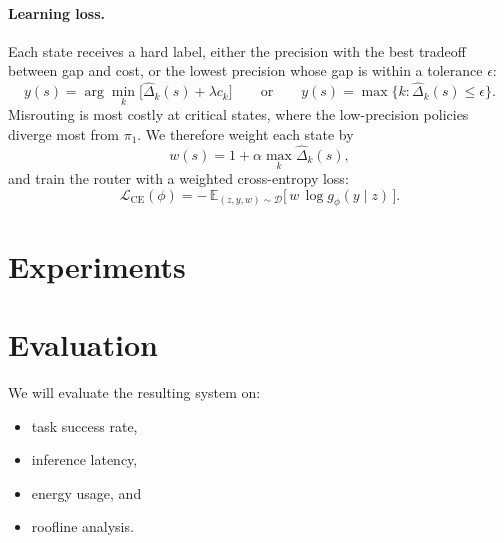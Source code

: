 \documentclass[11pt]{article}
\newcommand{\E}{\mathbb{E}}
\begin{document}
\paragraph{Learning loss.}
Each state receives a hard label, either the precision with the best
tradeoff between gap and cost, or the lowest precision whose gap is
within a tolerance $\epsilon$:
\begin{equation}
  y(s) = \arg\min_{k} \big[\hat{\Delta}_k(s) + \lambda c_k\big]
  \qquad \text{or} \qquad
  y(s) = \max\{k : \hat{\Delta}_k(s) \le \epsilon\}.
  \label{eq:label}
\end{equation}
Misrouting is most costly at critical states, where the low-precision
policies diverge most from $\pi_1$. We therefore weight each state by
\begin{equation}
  w(s) = 1 + \alpha \max_k \hat{\Delta}_k(s),
  \label{eq:weight}
\end{equation}
and train the router with a weighted cross-entropy loss:
\begin{equation}
  \mathcal{L}_{\mathrm{CE}}(\phi) = -\,\E_{(z, y, w) \sim \mathcal{D}}
  \big[\, w \, \log g_\phi(y \mid z) \,\big].
  \label{eq:loss}
\end{equation}

\section{Experiments}
\section{Evaluation}
We will evaluate the resulting system on:
\begin{itemize}
  \item task success rate,
  \item inference latency,
  \item energy usage, and
  \item roofline analysis.
\end{itemize}
\end{document}

